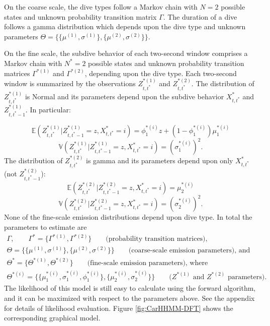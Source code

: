 On the coarse scale, the dive types follow a Markov chain with $N=2$ possible states and unknown probability transition matrix $\Gamma$. The duration of a dive follows a gamma distribution which depends upon the dive type and unknown parameters $\Theta = \{\{\mu^{(1)},\sigma^{(1)}\},\{\mu^{(2)},\sigma^{(2)}\}\}$.

On the fine scale, the subdive behavior of each two-second window comprises a Markov chain with $N^*=2$ possible states and unknown probability transition matrices $\Gamma^{*(1)}$ and $\Gamma^{*(2)}$, depending upon the dive type. Each two-second window is summarized by the observations $Z^{*(1)}_{t,t^*}$ and $Z^{*(2)}_{t,t^*}$. The distribution of $Z^{*(1)}_{t,t^*}$ is Normal and its parameters depend upon the subdive behavior $X^*_{t,t^*}$ and $Z^{*(1)}_{t,t^*-1}$. In particular:

$$\mathbb{E}(Z^{*(1)}_{t,t^*}|Z^{*(1)}_{t,t^*-1} = z,X^*_{t,t^*} = i) = \phi_1^{*(i)}z + (1-\phi_1^{*(i)}) \mu_1^{*(i)}$$
$$\mathbb{V}(Z^{*(1)}_{t,t^*}|Z^{*(1)}_{t,t^*-1} = z,X^*_{t,t^*} = i) = \left(\sigma_1^{*(i)}\right)^2.$$
%
The distribution of $Z^{*(2)}_{t,t^*}$ is gamma and its parameters depend upon only $X^*_{t,t^*}$ (not $Z^{*(2)}_{t,t^*-1}$):
%
$$\mathbb{E}(Z^{*(2)}_{t,t^*}|Z^{*(2)}_{t,t^*-1} = z,X^*_{t,t^*} = i) = \mu_2^{*(i)}$$
$$\mathbb{V}(Z^{*(2)}_{t,t^*}|Z^{*(2)}_{t,t^*-1} = z,X^*_{t,t^*} = i) = \left(\sigma_2^{*(i)}\right)^2.$$
%
None of the fine-scale emission distributions depend upon dive type. In total the parameters to estimate are
%
\begin{gather*}
    \Gamma, \qquad \Gamma^{*} = \{\Gamma^{*(1)},\Gamma^{*(2)}\} \qquad \text{(probability transition matrices)}, \\
    \Theta = \{\{\mu^{(1)},\sigma^{(1)}\},\{\mu^{(2)},\sigma^{(2)}\}\} \qquad \text{(coarse-scale emission parameters), and} \\
    \Theta^* = \{\Theta^{*(1)},\Theta^{*(2)}\}  \qquad \text{(fine-scale emission parameters), where} \\
    \Theta^{*(i)} =  \{\{\mu_1^{*(i)},\sigma_1^{*(i)},\phi_1^{*(i)}\},\{\mu_2^{*(i)},\sigma_2^{*(i)}\}\} \qquad \text{(}Z^{*(1)} \text{ and } Z^{*(2)} \text{ parameters).}
\end{gather*}
%
The likelihood of this model is still easy to calculate using the forward algorithm, and it can be maximized with respect to the parameters above. See the appendix for details of likelihood evaluation. Figure \ref{fig:CarHHMM-DFT} shows the corresponding graphical model.

